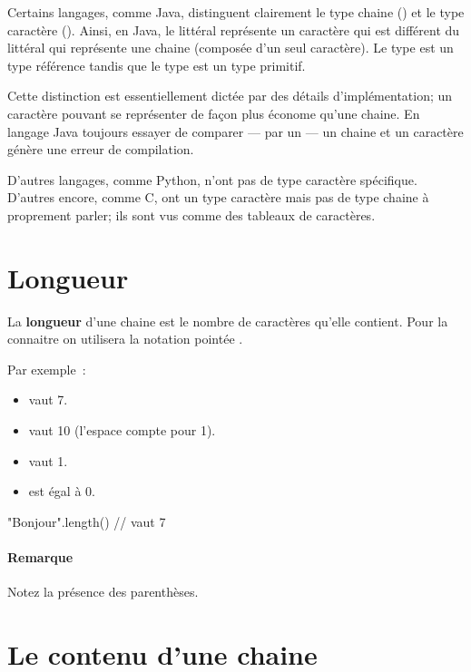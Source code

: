 	Certains langages, comme Java, distinguent clairement le type chaine
	() et le type caractère ().  Ainsi, en
	Java, le littéral  représente un caractère qui est différent du
	littéral  qui représente une chaine (composée d’un seul caractère).
	Le type  est un type référence tandis que le type  est
	un type primitif. 

	Cette distinction est essentiellement dictée par des détails
	d’implémentation; un caractère pouvant se représenter de façon plus économe
	qu’une chaine. En langage Java toujours essayer de comparer — par un
	 — un chaine et un caractère génère une erreur de
	compilation. 

	D’autres langages, comme Python, n’ont pas de type caractère spécifique.
	D’autres encore, comme C, ont un type caractère mais pas de type chaine
	à proprement parler; ils sont vus comme des tableaux de caractères. 


\section{Longueur}
	
	 La \textbf{longueur}
	d’une chaine est le nombre de caractères qu’elle contient.  Pour la
	connaitre on utilisera la notation pointée .
	
	Par exemple~:

	\begin{itemize}
	\item {} vaut 7.
	\item {} vaut 10 (l’espace compte pour 1).
	\item {} vaut 1.
	\item {} est égal à 0.
	\end{itemize}

	\begin{java}
"Bonjour".length() // vaut 7		
	\end{java}

	\paragraph{Remarque}
	Notez la présence des parenthèses.

	
	
\section{Le contenu d’une chaine}

